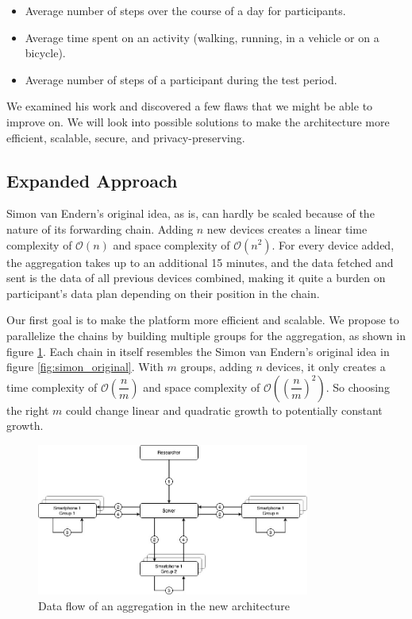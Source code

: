 \begin{itemize}
    \item Average number of steps over the course of a day for participants. 
    \item Average time spent on an activity (walking, running, in a vehicle or on a bicycle).
    \item Average number of steps of a participant during the test period. 
\end{itemize}

We examined his work and discovered a few flaws that we might be able to improve on. We will look into possible solutions to make the architecture more efficient, scalable, secure, and privacy-preserving. 

\subsection{Expanded Approach}
Simon van Endern's original idea, as is, can hardly be scaled because of the nature of its forwarding chain. Adding \(n\) new devices creates a linear time complexity of \(\mathcal{O}(n)\) and space complexity of \(\mathcal{O}(n^2)\). For every device added, the aggregation takes up to an additional 15 minutes, and the data fetched and sent is the data of all previous devices combined, making it quite a burden on participant's data plan depending on their position in the chain.

Our first goal is to make the platform more efficient and scalable. We propose to parallelize the chains by building multiple groups for the aggregation, as shown in figure \ref{fig:ar}. Each chain in itself resembles the Simon van Endern's original idea in figure \ref{fig:simon_original}. With \(m\) groups, adding \(n\) devices, it only creates a time complexity of \(\mathcal{O}(\dfrac{n}{m})\) and space complexity of \(\mathcal{O}((\dfrac{n}{m})^2)\). So choosing the right \(m\) could change linear and quadratic growth to potentially constant growth. 

\begin{figure}[htbp]
  \centering
  \includegraphics[width=0.8\textwidth]{figures/ar}
  \caption{Data flow of an aggregation in the new architecture} \label{fig:ar}
\end{figure}

